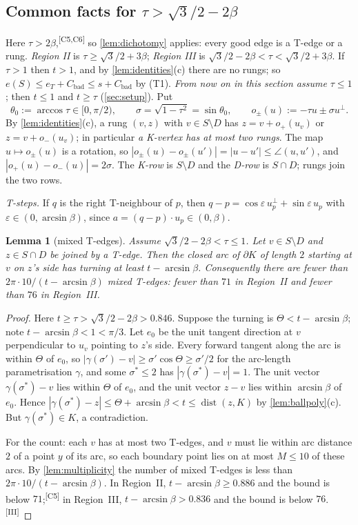 \documentclass[11pt]{amsart}
\newtheorem{lemma}[theorem]{Lemma}
\theoremstyle{definition}
\theoremstyle{remark}
\newcommand{\eps}{\varepsilon}
\newcommand{\dist}{\operatorname{dist}}
\newcommand{\chk}[1]{\textsuperscript{[#1]}}
\begin{document}
\subsection{Common facts for \texorpdfstring{$\tau>\sqrt3/2-2\beta$}{tau > sqrt3/2 - 2 beta}}\label{sec:common}
Here $\tau>2\beta$,\chk{C5,C6} so \cref{lem:dichotomy} applies: every good edge is a T-edge or a rung. \emph{Region II} is $\tau\ge\sqrt3/2+3\beta$; \emph{Region III} is $\sqrt3/2-2\beta<\tau<\sqrt3/2+3\beta$. If $\tau>1$ then $t>1$, and by \cref{lem:identities}(c) there are no rungs; so $e(S)\le e_T+C_{\mathrm{bad}}\le s+C_{\mathrm{bad}}$ by (T1). \emph{From now on in this section assume $\tau\le 1$}; then $t\le1$ and $t\ge\tau$ (\cref{sec:setup}). Put
\[
\theta_0:=\arccos\tau\in[0,\pi/2),\qquad \sigma=\sqrt{1-\tau^2}=\sin\theta_0,\qquad o_\pm(u):=-\tau u\pm\sigma u^\perp .
\]
By \cref{lem:identities}(c), a rung $(v,z)$ with $v\in S\setminus D$ has $z=v+o_+(u_v)$ or $z=v+o_-(u_v)$; in particular \emph{a K-vertex has at most two rungs}. The map $u\mapsto o_\pm(u)$ is a rotation, so $|o_\pm(u)-o_\pm(u')|=|u-u'|\le\angle(u,u')$, and $|o_+(u)-o_-(u)|=2\sigma$. The \emph{K-row} is $S\setminus D$ and the \emph{D-row} is $S\cap D$; rungs join the two rows.

\emph{T-steps.} If $q$ is the right T-neighbour of $p$, then $q-p=\cos\eps\,u_p^\perp+\sin\eps\,u_p$ with $\eps\in(0,\arcsin\beta)$, since $a=(q-p)\cdot u_p\in(0,\beta)$.

\begin{lemma}[mixed T-edges]\label{lem:mixedT}
Assume $\sqrt3/2-2\beta<\tau\le1$. Let $v\in S\setminus D$ and $z\in S\cap D$ be joined by a T-edge. Then the closed arc of $\partial K$ of length $2$ starting at $v$ on $z$'s side has turning at least $t-\arcsin\beta$. Consequently there are fewer than $2\pi\cdot10/(t-\arcsin\beta)$ mixed T-edges: fewer than $71$ in Region~II and fewer than $76$ in Region~III.
\end{lemma}
\begin{proof}
Here $t\ge\tau>\sqrt3/2-2\beta>0.846$. Suppose the turning is $\Theta<t-\arcsin\beta$; note $t-\arcsin\beta<1<\pi/3$. Let $e_0$ be the unit tangent direction at $v$ perpendicular to $u_v$ pointing to $z$'s side. Every forward tangent along the arc is within $\Theta$ of $e_0$, so $|\gamma(\sigma')-v|\ge\sigma'\cos\Theta\ge\sigma'/2$ for the arc-length parametrisation $\gamma$, and some $\sigma^*\le2$ has $|\gamma(\sigma^*)-v|=1$. The unit vector $\gamma(\sigma^*)-v$ lies within $\Theta$ of $e_0$, and the unit vector $z-v$ lies within $\arcsin\beta$ of $e_0$. Hence $|\gamma(\sigma^*)-z|\le\Theta+\arcsin\beta<t\le\dist(z,K)$ by \cref{lem:ballpoly}(c). But $\gamma(\sigma^*)\in K$, a contradiction.

For the count: each $v$ has at most two T-edges, and $v$ must lie within arc distance $2$ of a point $y$ of its arc, so each boundary point lies on at most $M\le10$ of these arcs. By \cref{lem:multiplicity} the number of mixed T-edges is less than $2\pi\cdot10/(t-\arcsin\beta)$. In Region~II, $t-\arcsin\beta\ge0.886$ and the bound is below $71$;\chk{C5} in Region~III, $t-\arcsin\beta>0.836$ and the bound is below $76$.\chk{III}
\end{proof}
\end{document}
